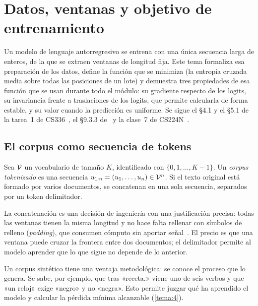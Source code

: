 \chapter{Datos, ventanas y objetivo de entrenamiento}
\label{tema:1}

Un modelo de lenguaje autorregresivo se entrena con una única secuencia larga de enteros, de la que se extraen ventanas de longitud fija. Este tema formaliza esa preparación de los datos, define la función que se minimiza (la entropía cruzada media sobre todas las posiciones de un lote) y demuestra tres propiedades de esa función que se usan durante todo el módulo: su gradiente respecto de los logits, su invariancia frente a traslaciones de los logits, que permite calcularla de forma estable, y su valor cuando la predicción es uniforme. Se sigue el §4.1 y el §5.1 de la tarea~1 de CS336~\cite{cs336}, el §9.3.3 de~\cite{d2l} y la clase~7 de CS224N~\cite{cs224n}.

\section{El corpus como secuencia de tokens}

\begin{definicion}\label{def:corpus}
Sea $\mathcal{V}$ un vocabulario de tamaño $K$, identificado con $\{0,1,\dots,K-1\}$. Un \emph{corpus tokenizado} es una secuencia $u_{1:n}=(u_1,\dots,u_n)\in\mathcal{V}^{n}$. Si el texto original está formado por varios documentos, se concatenan en una sola secuencia, separados por un token delimitador.
\end{definicion}

La concatenación es una decisión de ingeniería con una justificación precisa: todas las ventanas tienen la misma longitud y no hace falta rellenar con símbolos de relleno (\emph{padding}), que consumen cómputo sin aportar señal~\cite[§5.1]{cs336}. El precio es que una ventana puede cruzar la frontera entre dos documentos; el delimitador permite al modelo aprender que lo que sigue no depende de lo anterior.

\addtocounter{definicion}{1}%

Un corpus sintético tiene una ventaja metodológica: se conoce el proceso que lo genera. Se sabe, por ejemplo, que tras «receta.» viene uno de seis verbos y que «un reloj» exige «negro» y no «negra». Esto permite juzgar qué ha aprendido el modelo y calcular la pérdida mínima alcanzable (\cref{tema:4}).

